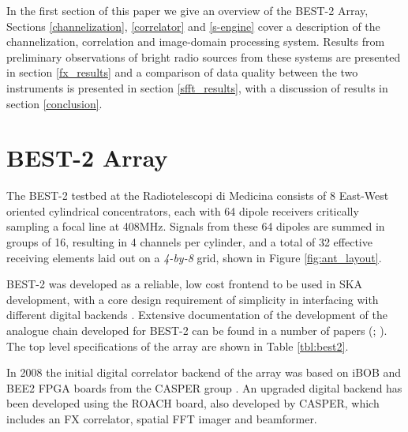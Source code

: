 \documentclass[useAMS,macros,usenatbib,onecolumn]{mn2e}
\begin{document}
In the first section of this paper we give an overview of the BEST-2 Array, Sections \ref{channelization}, \ref{correlator} and \ref{s-engine} cover a description of the channelization, correlation and image-domain processing system.
Results from preliminary observations of bright radio sources from these systems are presented in section \ref{fx_results} and a comparison of data quality between the two instruments is presented in section \ref{sfft_results}, with a discussion of results in section \ref{conclusion}.

\section{BEST-2 Array}
\label{best-2 array}

The BEST-2 testbed at the Radiotelescopi di Medicina consists of 8 East-West oriented cylindrical concentrators, each with 64 dipole receivers critically sampling a focal line at 408MHz.
Signals from these 64 dipoles are summed in groups of 16, resulting in 4 channels per cylinder, and a total of 32 effective receiving elements laid out on a \emph{4-by-8} grid, shown in Figure \ref{fig:ant_layout}.

BEST-2 was developed as a reliable, low cost frontend to be used in SKA development, with a core design requirement of simplicity in interfacing with different digital backends \citep{best2}.
Extensive documentation of the development of the analogue chain developed for BEST-2 can be found in a number of papers (\cite{best2-lna}; \cite{best2-rec}). The top level specifications of the array are shown in Table \ref{tbl:best2}.


In 2008 the initial digital correlator backend of the array was based on iBOB and BEE2 FPGA boards from the CASPER group \citep{best2-casper}.
An upgraded digital backend has been developed using the ROACH board, also developed by CASPER, which includes an FX correlator, spatial FFT imager and beamformer.
\end{document}
